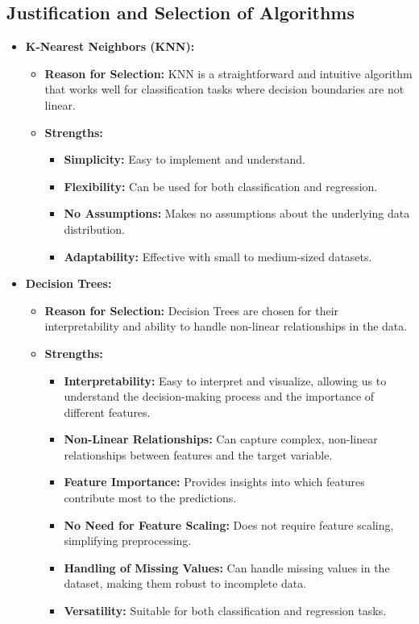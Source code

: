 \documentclass[a4paper,11pt]{article}
\begin{document}
\subsection{Justification and Selection of Algorithms}
\begin{itemize}
    \item \textbf{K-Nearest Neighbors (KNN):}
    \begin{itemize}
        \item \textbf{Reason for Selection:} KNN is a straightforward and intuitive algorithm that works well for classification tasks where decision boundaries are not linear.
        \item \textbf{Strengths:}
        \begin{itemize}
            \item \textbf{Simplicity:} Easy to implement and understand.
            \item \textbf{Flexibility:} Can be used for both classification and regression.
            \item \textbf{No Assumptions:} Makes no assumptions about the underlying data distribution.
            \item \textbf{Adaptability:} Effective with small to medium-sized datasets.
        \end{itemize}
    \end{itemize}
    \item \textbf{Decision Trees:}
    \begin{itemize}
        \item \textbf{Reason for Selection:} Decision Trees are chosen for their interpretability and ability to handle non-linear relationships in the data.
        \item \textbf{Strengths:}
        \begin{itemize}
            \item \textbf{Interpretability:} Easy to interpret and visualize, allowing us to understand the decision-making process and the importance of different features.
            \item \textbf{Non-Linear Relationships:} Can capture complex, non-linear relationships between features and the target variable.
            \item \textbf{Feature Importance:} Provides insights into which features contribute most to the predictions.
            \item \textbf{No Need for Feature Scaling:} Does not require feature scaling, simplifying preprocessing.
            \item \textbf{Handling of Missing Values:} Can handle missing values in the dataset, making them robust to incomplete data.
            \item \textbf{Versatility:} Suitable for both classification and regression tasks.
        \end{itemize}
    \end{itemize}
\end{itemize}
\end{document}
